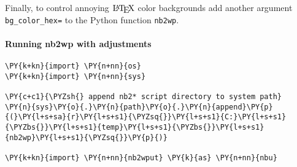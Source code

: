 \begin{Shaded}
\begin{Highlighting}[]
\InformationTok{:}\InformationTok{:}\InformationTok{:} \NormalTok{;}
\InformationTok{:}\InformationTok{:}\InformationTok{:} \NormalTok{;}
\InformationTok{:}\InformationTok{:}\InformationTok{:} \NormalTok{;}
\end{Highlighting}
\end{Shaded}

Finally, to control annoying \(\LaTeX\) color backgrounds add another
argument \texttt{bg\_color\_hex=\textquotesingle{}\textquotesingle{}} to
the Python function \texttt{nb2wp}.

    \hypertarget{running-nb2wp-with-adjustments}{%
\paragraph{Running nb2wp with
adjustments}\label{running-nb2wp-with-adjustments}}

    \begin{tcolorbox}[breakable, size=fbox, boxrule=1pt, pad at break*=1mm,colback=cellbackground, colframe=cellborder]
\begin{Verbatim}[commandchars=\\\{\}]
\PY{k+kn}{import} \PY{n+nn}{os}
\PY{k+kn}{import} \PY{n+nn}{sys}

\PY{c+c1}{\PYZsh{} append nb2* script directory to system path}
\PY{n}{sys}\PY{o}{.}\PY{n}{path}\PY{o}{.}\PY{n}{append}\PY{p}{(}\PY{l+s+sa}{r}\PY{l+s+s1}{\PYZsq{}}\PY{l+s+s1}{C:}\PY{l+s+s1}{\PYZbs{}}\PY{l+s+s1}{temp}\PY{l+s+s1}{\PYZbs{}}\PY{l+s+s1}{nb2wp}\PY{l+s+s1}{\PYZsq{}}\PY{p}{)}

\PY{k+kn}{import} \PY{n+nn}{nb2wput} \PY{k}{as} \PY{n+nn}{nbu}
\end{Verbatim}
\end{tcolorbox}

